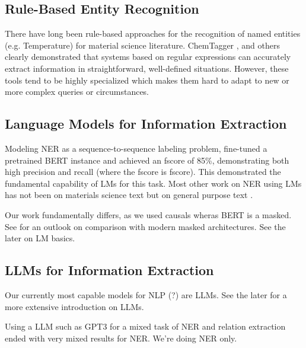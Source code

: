 

\subsection{Rule-Based Entity Recognition}
There have long been rule-based approaches for the recognition of named entities (e.g. Temperature) for material science literature.
ChemTagger \cite{hawizy_chemicaltagger_2011}, and others \cite{beard_comparative_2019, huang_database_2020}
clearly demonstrated that systems based on regular expressions can accurately extract information in straightforward, well-defined situations.
However, these tools tend to be highly specialized which makes them hard to adapt to new or more complex queries or circumstances.


\subsection{Language Models for Information Extraction}
Modeling \gls{NER} as a sequence-to-sequence labeling problem, \cite{zhao_finetuning_2021} fine-tuned a pretrained \gls{BERT} instance and achieved an \gls{fscore} of 85\%, demonstrating both high precision and recall (where the \gls{fscore} is \glsdesc{fscore}).
This demonstrated the fundamental capability of \glspl{LM} for this task.
Most other work on \gls{NER} using \glspl{LM} has not been on materials science text but on general purpose text \cite{li_survey_2022}.

Our work fundamentally differs, as we used \glspl{causal} wheras \gls{BERT} is a \gls{masked}. See  for an outlook on comparison with modern \gls{masked} architectures. See the later  on \acrlong{LM} basics.

\subsection{LLMs for Information Extraction}
Our currently most capable models for \gls{NLP} (?) are \glspl{LLM}. See the later  for a more extensive introduction on \glspl{LLM}. 

Using a \gls{LLM} such as \gls{GPT3} for a mixed task of \gls{NER} and relation extraction ended with very mixed results for \gls{NER}. \cite{dunn_structured_2022}
We're doing \gls{NER} only.


